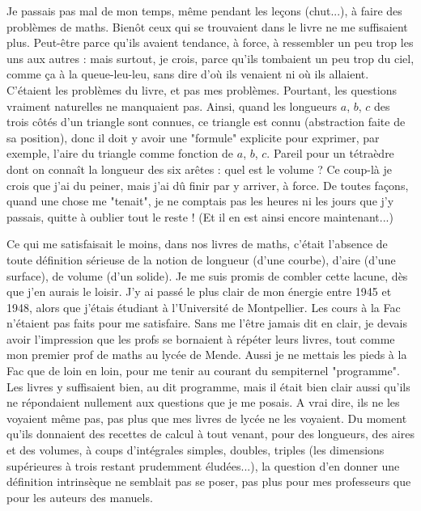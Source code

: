 Je passais pas mal de mon temps, même pendant les leçons (chut...), à faire des problèmes de maths. Bienôt ceux qui se trouvaient dans le livre ne me suffisaient plus. Peut-être parce qu’ils avaient tendance, à force, à ressembler un peu trop les uns aux autres : mais surtout, je crois, parce qu’ils tombaient un peu trop du ciel, comme ça à la queue-leu-leu, sans dire d’où ils venaient ni où ils allaient. C’étaient les problèmes du livre, et pas mes problèmes. Pourtant, les questions vraiment naturelles ne manquaient pas. Ainsi, quand les longueurs $a$, $b$, $c$ des trois côtés d’un triangle sont connues, ce triangle est connu (abstraction faite de sa position), donc il doit y avoir une "formule" explicite pour exprimer, par exemple, l’aire du triangle comme fonction de $a$, $b$, $c$. Pareil pour un tétraèdre dont on connaît la longueur des six arêtes : quel est le volume ? Ce coup-là je crois que j’ai du peiner, mais j’ai dû finir par y arriver, à force. De toutes façons, quand une chose me "tenait", je ne comptais pas les heures ni les jours que j’y passais, quitte à oublier tout le reste ! (Et il en est ainsi encore maintenant...)

Ce qui me satisfaisait le moins, dans nos livres de maths, c’était l’absence de toute définition sérieuse de la notion de longueur (d’une courbe), d’aire (d’une surface), de volume (d’un solide). Je me suis promis de combler cette lacune, dès que j’en aurais le loisir. J’y ai passé le plus clair de mon énergie entre 1945 et 1948, alors que j’étais étudiant à l’Université de Montpellier. Les cours à la Fac n’étaient pas faits pour me satisfaire. Sans me l’être jamais dit en clair, je devais avoir l’impression que les profs se bornaient à répéter leurs livres, tout comme mon premier prof de maths au lycée de Mende. Aussi je ne mettais les pieds à la Fac que de loin en loin, pour me tenir au courant du sempiternel "programme". Les livres y suffisaient bien, au dit programme, mais il était bien clair aussi qu’ils ne répondaient nullement aux questions que je me posais. A vrai dire, ils ne les voyaient même pas, pas plus que mes livres de lycée ne les voyaient. Du moment qu’ils donnaient des recettes de calcul à tout venant, pour des longueurs, des aires et des volumes, à coups d’intégrales simples, doubles, triples (les dimensions supérieures à trois restant prudemment éludées...), la question d’en donner une définition intrinsèque ne semblait pas se poser, pas plus pour mes professeurs que pour les auteurs des manuels.

